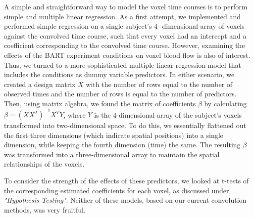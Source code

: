 \par \indent A simple and straightforward way to model the voxel time courses 
is to perform simple and multiple linear regression. As a first attempt, we 
implemented and performed simple regression on a single subject's 4-
dimensional array of voxels against the convolved time course, such that 
every voxel had an intercept and a coefficient corresponding to the convolved 
time course. However, examining the effects of the BART experiment conditions 
on voxel blood flow is also of interest. Thus, we turned to a more 
sophisticated multiple linear regression model that includes the conditions 
as dummy variable predictors. In either scenario, we created a design matrix 
$X$ with the number of rows equal to the number of observed times and the 
number of rows is equal to the number of predictors. Then, using matrix 
algebra, we found the matrix of coefficients $\beta$ by calculating $\beta = 
(X X^T)^{-1} X^T Y$, where $Y$ is the 4-dimensional array of the subject's 
voxels transformed into two-dimensional space. To do this, we essentially 
flattened out the first three dimensions (which indicate spatial positions) 
into a single dimension, while keeping the fourth dimension (time) the same. 
The resulting $\beta$ was transformed into a three-dimensional array to 
maintain the spatial relationships of the voxels. 

\par To consider the strength of the effects of these predictors, we looked 
at t-tests of the corresponding estimated coefficients for each voxel, as 
discussed under \textit{"Hypothesis Testing"}. Neither of these models, based 
on our current convolution methods, was very fruitful. 

